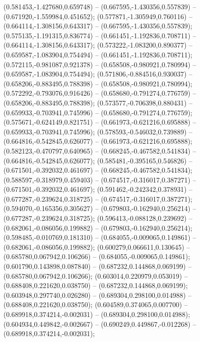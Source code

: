  (0.581453,-1.427680,0.659748) -- (0.667595,-1.430356,0.557839) -- (0.671920,-1.559984,0.451652);
 (0.577871,-1.305949,0.760116) -- (0.664114,-1.308156,0.643317) -- (0.667595,-1.430356,0.557839);
 (0.575135,-1.191315,0.836774) -- (0.661451,-1.192836,0.708711) -- (0.664114,-1.308156,0.643317);
 (0.573222,-1.083200,0.890377) -- (0.659587,-1.083904,0.754494) -- (0.661451,-1.192836,0.708711);
 (0.572115,-0.981087,0.921378) -- (0.658508,-0.980921,0.780994) -- (0.659587,-1.083904,0.754494);
 (0.571806,-0.884516,0.930037) -- (0.658206,-0.883495,0.788398) -- (0.658508,-0.980921,0.780994);
 (0.572292,-0.793076,0.916426) -- (0.658680,-0.791274,0.776759) -- (0.658206,-0.883495,0.788398);
 (0.573577,-0.706398,0.880431) -- (0.659933,-0.703941,0.745996) -- (0.658680,-0.791274,0.776759);
 (0.575671,-0.624149,0.821751) -- (0.661973,-0.621216,0.695888) -- (0.659933,-0.703941,0.745996);
 (0.578593,-0.546032,0.739889) -- (0.664816,-0.542845,0.626077) -- (0.661973,-0.621216,0.695888);
 (0.582123,-0.470797,0.640965) -- (0.668245,-0.467582,0.541834) -- (0.664816,-0.542845,0.626077);
 (0.585481,-0.395165,0.546826) -- (0.671501,-0.392032,0.461697) -- (0.668245,-0.467582,0.541834);
 (0.588597,-0.318979,0.459403) -- (0.674517,-0.316017,0.387271) -- (0.671501,-0.392032,0.461697);
 (0.591462,-0.242342,0.378931) -- (0.677287,-0.239624,0.318725) -- (0.674517,-0.316017,0.387271);
 (0.594070,-0.165356,0.305627) -- (0.679803,-0.162940,0.256214) -- (0.677287,-0.239624,0.318725);
 (0.596413,-0.088128,0.239692) -- (0.682061,-0.086056,0.199882) -- (0.679803,-0.162940,0.256214);
 (0.598485,-0.010769,0.181310) -- (0.684055,-0.009065,0.149861) -- (0.682061,-0.086056,0.199882);
 (0.600279,0.066611,0.130645) -- (0.685780,0.067942,0.106266) -- (0.684055,-0.009065,0.149861);
 (0.601790,0.143898,0.087840) -- (0.687232,0.144868,0.069199) -- (0.685780,0.067942,0.106266);
 (0.603014,0.220979,0.053019) -- (0.688408,0.221620,0.038750) -- (0.687232,0.144868,0.069199);
 (0.603948,0.297740,0.026280) -- (0.689304,0.298100,0.014988) -- (0.688408,0.221620,0.038750);
 (0.604589,0.374065,0.007700) -- (0.689918,0.374214,-0.002031) -- (0.689304,0.298100,0.014988);
 (0.604934,0.449842,-0.002667) -- (0.690249,0.449867,-0.012268) -- (0.689918,0.374214,-0.002031);
